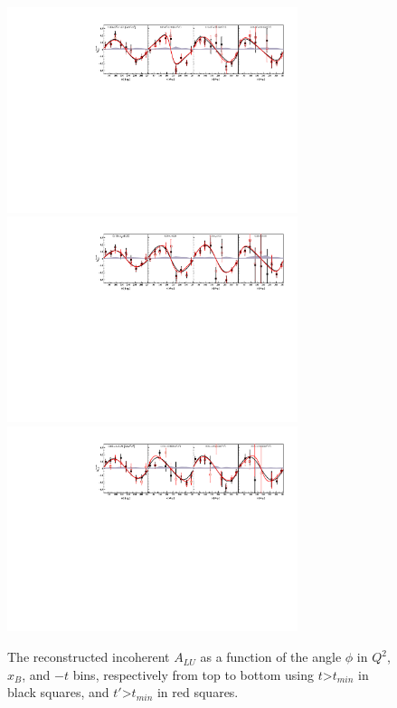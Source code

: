 \documentclass[a4paper,11pt,twoside]{article}
\begin{document}
\begin{figure}[h!]
   \includegraphics[height=6.0cm]{fig/ALU_phi_p_Q2.pdf}
   \includegraphics[height=6.0cm]{fig/ALU_phi_p_x.pdf}
   \includegraphics[height=6.0cm]{fig/ALU_phi_p_t.pdf}
\caption{The reconstructed incoherent $A_{LU}$ as a function of the angle 
   $\phi$ in $Q^2$, $x_B$, and $-t$ bins, respectively from top to bottom using 
$t$>$t_{min}$ in black squares, and $t'$>$t_{min}$ in red squares.}
   \label{fig:bsa_incoh_bins}
\end{figure}
\end{document}
